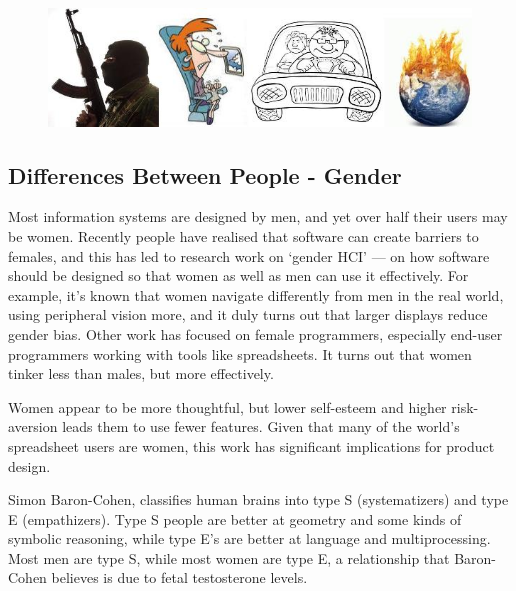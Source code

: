 		\begin{figure}[H]
			\centering
			\includegraphics[scale=0.5]{pics/uncertainty.jpg}
		\end{figure}

	\subsection*{Differences Between People - Gender}
		Most information systems are designed by men, and yet over half their
		users may be women. Recently people have realised that software can create
		barriers to females, and this has led to research work on ‘gender HCI’ — on
		how software should be designed so that women as well as men can use
		it effectively. For example, it’s known that women navigate differently from
		men in the real world, using peripheral vision more, and it duly turns
		out that larger displays reduce gender bias. Other work has focused on
		female programmers, especially end-user programmers working with tools
		like spreadsheets. It turns out that women tinker less than males, but more
		effectively. 

		Women appear to be more thoughtful, but lower self-esteem and
		higher risk-aversion leads them to use fewer features. Given that many of the
		world’s spreadsheet users are women, this work has significant implications
		for product design.

		Simon Baron-Cohen, classifies human brains into type S (systematizers) and 
		type E (empathizers). Type S people are better at geometry and some 
		kinds of symbolic reasoning, while type E's are better at language and 
		multiprocessing. Most men are type S, while most women are type E, a 
		relationship that Baron-Cohen believes is due to
		fetal testosterone levels. 

